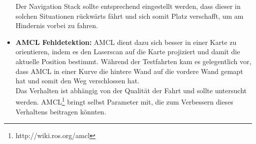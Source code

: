\begin{itemize}
	Der Navigation Stack sollte entsprechend eingestellt werden, dass dieser in solchen Situationen r\"uckw\"arts f\"ahrt und sich somit Platz verschafft, um am Hindernis vorbei zu fahren.
	\item \textbf{AMCL Fehldetektion:} AMCL dient dazu sich besser in einer Karte zu orientieren, indem es den Laserscan auf die Karte projiziert und damit die aktuelle Position bestimmt. W\"ahrend der Testfahrten kam es gelegentlich vor, dass AMCL in einer Kurve die hintere Wand auf die vordere Wand gemapt hat und somit den Weg verschlossen hat.\\
	Das Verhalten ist abh\"angig von der Qualit\"at der Fahrt und sollte untersucht werden. AMCL\footnote{http://wiki.ros.org/amcl} bringt selbst Parameter mit, die zum Verbessern dieses Verhaltens beitragen k\"onnten.
\end{itemize}